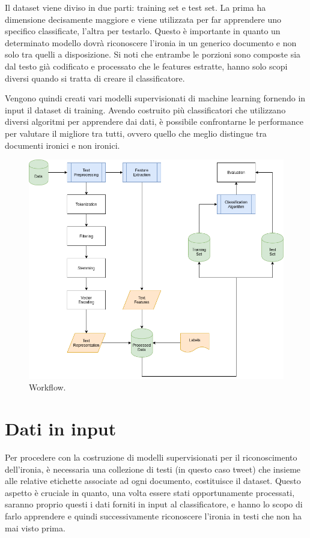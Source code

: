 \documentclass[oneside]{book}
\begin{document}
Il dataset viene diviso in due parti: training set e test set. La prima ha dimensione decisamente maggiore e viene utilizzata per far apprendere uno specifico classificate, l'altra per testarlo. Questo è importante in quanto un determinato modello dovrà riconoscere l'ironia in un generico documento e non solo tra quelli a disposizione. Si noti che entrambe le porzioni sono composte sia dal testo già codificato e processato che le features estratte, hanno solo scopi diversi quando si tratta di creare il classificatore. 

Vengono quindi creati vari modelli supervisionati di machine learning fornendo in input il dataset di training. Avendo costruito più classificatori che utilizzano diversi algoritmi per apprendere dai dati, è possibile confrontarne le performance per valutare il migliore tra tutti, ovvero quello che meglio distingue tra documenti ironici e non ironici.

\begin{figure}
	\includegraphics[width=\linewidth]{assets/Workflow.png}
	\caption{Workflow.}
	\label{fig:workflow}
\end{figure}


\clearpage

\section{Dati in input}

Per procedere con la costruzione di modelli supervisionati per il riconoscimento dell'ironia, è necessaria una collezione di testi (in questo caso tweet) che insieme alle relative etichette associate ad ogni documento, costituisce il dataset. Questo aspetto è cruciale in quanto, una volta essere stati opportunamente processati, saranno proprio questi i dati forniti in input al classificatore, e hanno lo scopo di farlo apprendere e quindi successivamente riconoscere l'ironia in testi che non ha mai visto prima.
\end{document}
